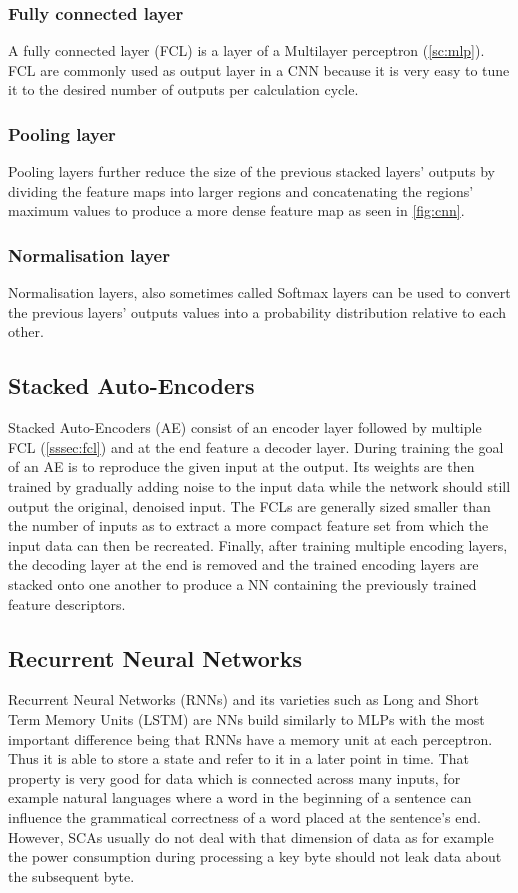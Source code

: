 \documentclass[journal]{IEEEtran}
\begin{document}
\subsubsection{Fully connected layer}
\label{sssec:fcl}
A fully connected layer (FCL) is a layer of a Multilayer perceptron (\autoref{sc:mlp}). FCL are commonly used as output layer in a CNN because it is very easy to tune it to the desired number of outputs per calculation cycle.

\subsubsection{Pooling layer}
Pooling layers further reduce the size of the previous stacked layers' outputs by dividing the feature maps into larger regions and concatenating the regions' maximum values to produce a more dense feature map as seen in \autoref{fig:cnn}.
 
\subsubsection{Normalisation layer}
Normalisation layers, also sometimes called Softmax layers can be used to convert the previous layers' outputs values into a probability distribution relative to each other. 

\subsection{Stacked Auto-Encoders}
Stacked Auto-Encoders (AE) consist of an encoder layer followed by multiple FCL (\autoref{sssec:fcl}) and at the end feature a decoder layer. During training the goal of an AE is to reproduce the given input at the output. Its weights are then trained by gradually adding noise to the input data while the network should still output the original, denoised input. The FCLs are generally sized smaller than the number of inputs as to extract a more compact feature set from which the input data can then be recreated. Finally, after training multiple encoding layers, the decoding layer at the end is removed and the trained encoding layers are stacked onto one another to produce a NN containing the previously trained feature descriptors.

\subsection{Recurrent Neural Networks}
Recurrent Neural Networks (RNNs) and its varieties such as Long and Short Term Memory Units (LSTM) are NNs build similarly to MLPs with the most important difference being that RNNs have a memory unit at each perceptron. Thus it is able to store a state and refer to it in a later point in time. That property is very good for data which is connected across many inputs, for example natural languages where a word in the beginning of a sentence can influence the grammatical correctness of a word placed at the sentence's end. However, SCAs usually do not deal with that dimension of data as for example the power consumption during processing a key byte should not leak data about the subsequent byte.
\end{document}
